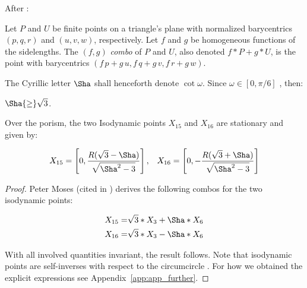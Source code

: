 
After \cite{etc}:

\begin{definition}
Let $P$ and $U$ be finite points on a triangle's plane with normalized barycentrics $(p,q,r)$ and $(u,v,w)$, respectively. Let $f$ and $g$ be homogeneous functions of the sidelengths. The $(f,g)$ {\em combo} of $P$ and $U$, also denoted $f*P + g*U$, is the point with barycentrics $(f\,p + g\,u,f\,q + g\,v, f\,r + g\,w)$.
\end{definition}

\noindent The Cyrillic letter $\Sha$ shall henceforth denote $\cot\omega$. Since $\omega\in[0,\pi/6]$ \cite[Brocard Angle]{mw}, then:

\begin{remark}
 $\Sha{\geq}\sqrt{3}$.
 \label{rem:sha-min}
\end{remark}

\begin{lemma}
Over the porism, the two Isodynamic points $X_{15}$ and $X_{16}$ are stationary and given by:

\[
X_{15}=\left[0, \frac{R(\sqrt{3}-\Sha)}{
 \sqrt{\Sha^2-3}}\right],\;\;\;
  X_{16}=\left[0, -\frac{R(\sqrt{3}+\Sha)}{
 \sqrt{\Sha^2-3}}\right]
\]
\label{lem:x15x16}
\end{lemma}

\begin{proof}
Peter Moses (cited in \cite[X(15), X(16)]{etc}) derives the following combos for the two isodynamic points:

\begin{align}
X_{15} =& \sqrt{3}*X_3 + \Sha*X_6 \label{eqn:combo-x15} \\
X_{16} =& \sqrt{3}*X_3 - \Sha*X_6 \nonumber
\end{align}

With all involved quantities invariant, the result follows. Note that isodynamic points are self-inverses with respect to the circumcircle  \cite[Isodynamic Points]{mw}. For how we obtained the explicit expressions see Appendix~\ref{app:app_further}.
\end{proof}

